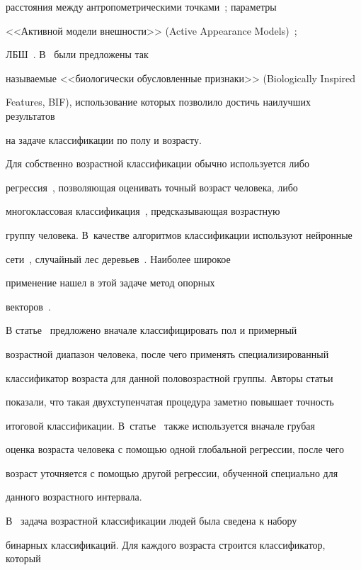 расстояния между антропометрическими точками~\cite{14-r}; параметры

<<Активной модели внешности>> (Active Appearance Models)~\cite{8-r};

ЛБШ~\cite{12-r}. В~\cite{10-r} были предложены так

называемые <<биологически обусловленные признаки>> (Biologically Inspired

Features, BIF), использование которых позволило достичь наилучших результатов

на задаче классификации по полу и возрасту.



\pagebreak



Для собственно возрастной классификации обычно используется либо

регрессия~\cite{10-r}, позволяющая оценивать точный возраст человека, либо

многоклассовая классификация~\cite{10-r, 9-r}, предсказывающая возрастную

группу человека. В~качестве алгоритмов классификации используют нейронные

сети~\cite{11-r}, случайный лес деревьев~\cite{14-r}. Наиболее широкое

применение нашел в этой задаче метод опорных

векторов~\cite{5-r, 8-r, 10-r,  9-r, 4-r}.



В статье~\cite{9-r} предложено вначале классифицировать пол и примерный

возрастной диапазон человека, после чего применять специализированный

классификатор возраста для данной половозрастной группы. Авторы статьи

показали, что такая двухступенчатая процедура заметно повышает точность

итоговой классификации. В~статье~\cite{2-r} также используется вначале грубая

оценка возраста человека с помощью одной глобальной регрессии, после чего

возраст уточняется с помощью другой регрессии, обученной специально для

данного возрастного интервала.



В~\cite{4-r} задача возрастной классификации людей была сведена к набору

бинарных классификаций. Для каждого возраста строится классификатор, который

